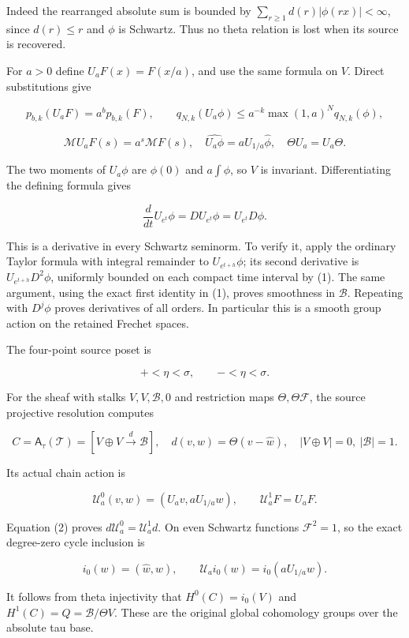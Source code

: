 Indeed the rearranged absolute sum is bounded by
\(\sum_{r\geq1}d(r)|\phi(rx)|<\infty\), since \(d(r)\leq r\) and
\(\phi\) is Schwartz. Thus no theta relation is lost when its source is
recovered.

For \(a>0\) define \(U_aF(x)=F(x/a)\), and use the same formula on
\(V\). Direct substitutions give

\[
p_{b,k}(U_aF)=a^b p_{b,k}(F),\qquad
q_{N,k}(U_a\phi)\leq a^{-k}\max(1,a)^Nq_{N,k}(\phi),
\tag{1}
\]

\[
\mathcal MU_aF(s)=a^s\mathcal MF(s),\quad
\widehat{U_a\phi}=aU_{1/a}\widehat\phi,\quad
\Theta U_a=U_a\Theta.\tag{2}
\]

The two moments of \(U_a\phi\) are \(\phi(0)\) and \(a\int\phi\), so
\(V\) is invariant. Differentiating the defining formula gives

\[\frac{d}{dt}U_{e^t}\phi=DU_{e^t}\phi=U_{e^t}D\phi.\]

This is a derivative in every Schwartz seminorm. To verify it, apply the
ordinary Taylor formula with integral remainder to \(U_{e^{t+h}}\phi\);
its second derivative is \(U_{e^{t+h}}D^2\phi\), uniformly bounded on
each compact time interval by (1). The same argument, using the exact
first identity in (1), proves smoothness in \(\mathscr B\). Repeating
with \(D^j\phi\) proves derivatives of all orders. In particular this is
a smooth group action on the retained Frechet spaces.

The four-point source poset is

\[+<\eta<\sigma,\qquad -<\eta<\sigma.\]

For the sheaf with stalks \(V,V,\mathscr B,0\) and restriction maps
\(\Theta,\Theta\mathcal F\), the source projective resolution computes

\[
C=\mathsf A_\tau(\mathcal T)
=\left[V\oplus V\xrightarrow{d}\mathscr B\right],
\quad d(v,w)=\Theta(v-\widehat w),\quad |V\oplus V|=0,\ |\mathscr B|=1.
\tag{3}
\]

Its actual chain action is

\[
\mathcal U_a^0(v,w)=(U_av,aU_{1/a}w),\qquad
\mathcal U_a^1F=U_aF.\tag{4}
\]

Equation (2) proves \(d\mathcal U_a^0=\mathcal U_a^1d\). On even
Schwartz functions \(\mathcal F^2=1\), so the exact degree-zero cycle
inclusion is

\[i_0(w)=(\widehat w,w),\qquad
\mathcal U_ai_0(w)=i_0(aU_{1/a}w).\tag{5}\]

It follows from theta injectivity that \(H^0(C)=i_0(V)\) and
\(H^1(C)=Q=\mathscr B/\Theta V\). These are the original global
cohomology groups over the absolute tau base.

